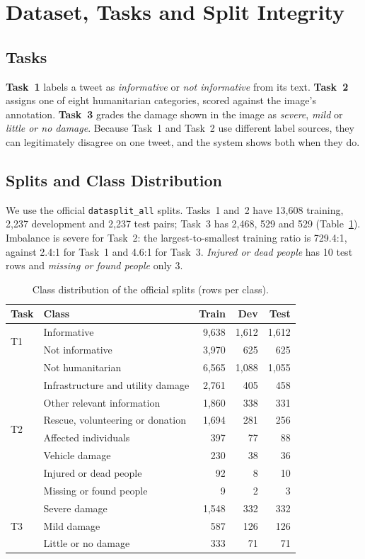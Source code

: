 \documentclass[conference]{IEEEtran}
\begin{document}
\section{Dataset, Tasks and Split Integrity}

\subsection{Tasks}
\textbf{Task~1} labels a tweet as \emph{informative} or \emph{not informative} from its text. \textbf{Task~2} assigns one of eight humanitarian categories, scored against the image's annotation. \textbf{Task~3} grades the damage shown in the image as \emph{severe}, \emph{mild} or \emph{little or no damage}. Because Task~1 and Task~2 use different label sources, they can legitimately disagree on one tweet, and the system shows both when they do.

\subsection{Splits and Class Distribution}
We use the official \texttt{datasplit\_all} splits. Tasks~1 and~2 have 13,608 training, 2,237 development and 2,237 test pairs; Task~3 has 2,468, 529 and 529 (Table~\ref{tab:classes}). Imbalance is severe for Task~2: the largest-to-smallest training ratio is 729.4:1, against 2.4:1 for Task~1 and 4.6:1 for Task~3. \emph{Injured or dead people} has 10 test rows and \emph{missing or found people} only 3.

\begin{table}[t]
\centering
\caption{Class distribution of the official splits (rows per class).}
\label{tab:classes}
\footnotesize
\setlength{\tabcolsep}{4pt}
\begin{tabular}{llrrr}
\toprule
Task & Class & Train & Dev & Test \\
\midrule
\multirow{2}{*}{T1} & Informative & 9,638 & 1,612 & 1,612 \\
 & Not informative & 3,970 & 625 & 625 \\
\midrule
\multirow{8}{*}{T2} & Not humanitarian & 6,565 & 1,088 & 1,055 \\
 & Infrastructure and utility damage & 2,761 & 405 & 458 \\
 & Other relevant information & 1,860 & 338 & 331 \\
 & Rescue, volunteering or donation & 1,694 & 281 & 256 \\
 & Affected individuals & 397 & 77 & 88 \\
 & Vehicle damage & 230 & 38 & 36 \\
 & Injured or dead people & 92 & 8 & 10 \\
 & Missing or found people & 9 & 2 & 3 \\
\midrule
\multirow{3}{*}{T3} & Severe damage & 1,548 & 332 & 332 \\
 & Mild damage & 587 & 126 & 126 \\
 & Little or no damage & 333 & 71 & 71 \\
\bottomrule
\end{tabular}
\end{table}
\end{document}
